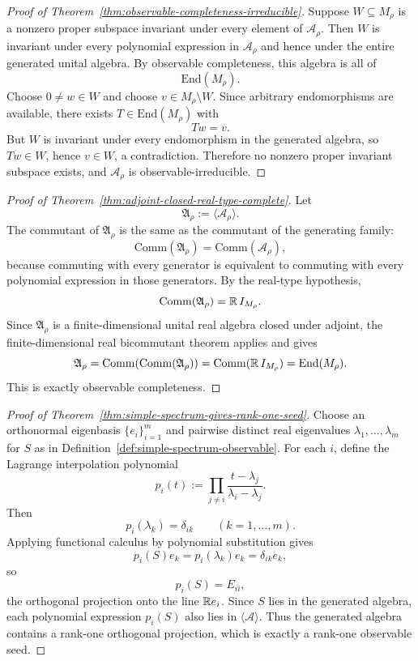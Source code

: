 \begin{proof}[Proof of Theorem~\ref{thm:observable-completeness-irreducible}]
\label{proof:thm:observable-completeness-irreducible}
Suppose $W\subseteq M_{\rho}$ is a nonzero proper subspace invariant under
every element of $\mathcal A_{\rho}$. Then $W$ is invariant under every
polynomial expression in $\mathcal A_{\rho}$ and hence under the entire
generated unital algebra. By observable completeness, this algebra is all of
\[
\mathrm{End}(M_{\rho}).
\]
Choose $0\neq w\in W$ and choose $v\in M_{\rho}\setminus W$. Since arbitrary
endomorphisms are available, there exists $T\in\mathrm{End}(M_{\rho})$ with
\[
Tw=v.
\]
But $W$ is invariant under every endomorphism in the generated algebra, so
$Tw\in W$, hence $v\in W$, a contradiction. Therefore no nonzero proper
invariant subspace exists, and $\mathcal A_{\rho}$ is observable-irreducible.
\end{proof}

\begin{proof}[Proof of Theorem~\ref{thm:adjoint-closed-real-type-complete}]
\label{proof:thm:adjoint-closed-real-type-complete}
Let
\[
\mathfrak A_{\rho}:=\langle\mathcal A_{\rho}\rangle.
\]
The commutant of $\mathfrak A_{\rho}$ is the same as the commutant of the
generating family:
\[
\mathrm{Comm}(\mathfrak A_{\rho})=\mathrm{Comm}(\mathcal A_{\rho}),
\]
because commuting with every generator is equivalent to commuting with every
polynomial expression in those generators. By the real-type hypothesis,
\[
\mathrm{Comm}(\mathfrak A_{\rho})=\mathbb{R}\,I_{M_{\rho}}.
\]
Since $\mathfrak A_{\rho}$ is a finite-dimensional unital real algebra closed
under adjoint, the finite-dimensional real bicommutant theorem applies and
gives
\[
\mathfrak A_{\rho}
=
\mathrm{Comm}(\mathrm{Comm}(\mathfrak A_{\rho}))
=
\mathrm{Comm}(\mathbb{R}\,I_{M_{\rho}})
=
\mathrm{End}(M_{\rho}).
\]
This is exactly observable completeness.
\end{proof}

\begin{proof}[Proof of Theorem~\ref{thm:simple-spectrum-gives-rank-one-seed}]
\label{proof:thm:simple-spectrum-gives-rank-one-seed}
Choose an orthonormal eigenbasis $\{e_i\}_{i=1}^m$ and pairwise distinct real
eigenvalues $\lambda_1,\dots,\lambda_m$ for $S$ as in
Definition~\ref{def:simple-spectrum-observable}. For each $i$, define the
Lagrange interpolation polynomial
\[
p_i(t):=\prod_{j\neq i}\frac{t-\lambda_j}{\lambda_i-\lambda_j}.
\]
Then
\[
p_i(\lambda_k)=\delta_{ik}
\qquad(k=1,\dots,m).
\]
Applying functional calculus by polynomial substitution gives
\[
p_i(S)e_k=p_i(\lambda_k)e_k=\delta_{ik}e_k,
\]
so
\[
p_i(S)=E_{ii},
\]
the orthogonal projection onto the line $\mathbb{R} e_i$. Since $S$ lies in the
generated algebra, each polynomial expression $p_i(S)$ also lies in
$\langle\mathcal A\rangle$. Thus the generated algebra contains a rank-one
orthogonal projection, which is exactly a rank-one observable seed.
\end{proof}

